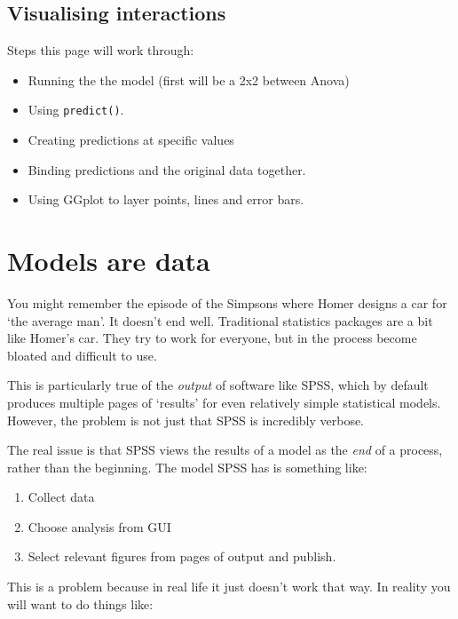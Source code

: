 \documentclass[]{article}
\providecommand{\tightlist}{%
  \setlength{\itemsep}{0pt}\setlength{\parskip}{0pt}}
\begin{document}
\hypertarget{visualising-interactions}{%
\subsection*{Visualising interactions}\label{visualising-interactions}}

Steps this page will work through:

\begin{itemize}
\tightlist
\item
  Running the the model (first will be a 2x2 between Anova)
\item
  Using \texttt{predict()}.
\item
  Creating predictions at specific values
\item
  Binding predictions and the original data together.
\item
  Using GGplot to layer points, lines and error bars.
\end{itemize}

\hypertarget{models-are-data-too}{%
\section{Models are data}\label{models-are-data-too}}

You might remember the episode of the Simpsons where Homer designs a car for
`the average man'. It doesn't end well. Traditional statistics packages are a
bit like Homer's car. They try to work for everyone, but in the process become
bloated and difficult to use.

This is particularly true of the \emph{output} of software like SPSS, which by
default produces multiple pages of `results' for even relatively simple
statistical models. However, the problem is not just that SPSS is incredibly
verbose.

The real issue is that SPSS views the results of a model as the \emph{end} of a
process, rather than the beginning. The model SPSS has is something like:

\begin{enumerate}
\def\labelenumi{\arabic{enumi}.}
\tightlist
\item
  Collect data
\item
  Choose analysis from GUI
\item
  Select relevant figures from pages of output and publish.
\end{enumerate}

This is a problem because in real life it just doesn't work that way. In reality
you will want to do things like:
\end{document}
